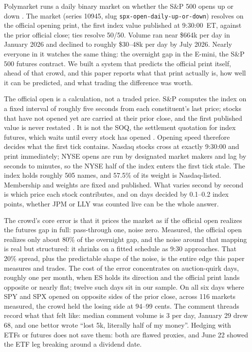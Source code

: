 \label{sec:introduction}

Polymarket runs a daily binary market on whether the S\&P 500 opens up or
down \citep{polymarket2026spxmarket}. The market (series 10945, slug
\texttt{spx-open-daily-up-or-down}) resolves on the official opening print,
the first index value published at 9:30:00~ET, against the prior
official close; ties resolve 50/50. Volume ran near \$664k per day in
January 2026 and declined to roughly \$30--48k per day by July 2026. Nearly
everyone in it watches the same thing: the overnight gap in the E-mini,
the S\&P 500 futures contract. We built a system that predicts the
official print itself, ahead of that crowd, and this paper reports what
that print actually is, how well it can be predicted, and what trading the
difference was worth.

The official open is a calculation, not a traded price. S\&P computes the
index on a fixed interval of roughly five seconds from each constituent's
last price; stocks that have not opened yet are carried at their prior
close, and the first published value is never restated
\citep{spdji2026indexmath}. It is not the SOQ, the settlement quotation
for index futures, which waits until every stock has opened
\citep{cme2026soq}. Opening speed therefore decides what the first tick
contains. Nasdaq stocks cross at exactly 9:30:00 and print immediately;
NYSE opens are run by designated market makers and lag by seconds to
minutes, so the NYSE half of the index enters the first tick stale. The
index holds roughly 505 names, and 57.5\% of its weight is Nasdaq-listed.
Membership and weights are fixed and published. What varies second by
second is which price each stock contributes, and on days decided by
0.1--0.2 index points, whether JPM or LLY was counted live can be the whole
answer.

The crowd's core error is that it prices the market as if the official open
realizes the futures gap in full: pass-through one, noise zero. Measured,
the official open realizes only about 80\% of the overnight gap, and the
noise around that mapping is real but structured: it shrinks on a fitted
schedule as 9:30 approaches. That 20\% spread, plus the predictable shape
of the noise, is the entire edge this paper measures and trades. The cost
of the error concentrates on auction-quirk days, roughly one per month,
when ES holds its direction and the official print lands opposite or nearly
flat; twelve such days sit in our sample. On all six days where SPY and SPX
opened on opposite sides of the prior close, across 116 markets measured,
the crowd held the losing side at 94--99 cents. The comment threads record
what that felt like: median comment volume is 3 per day, January 29 drew
68, and one bettor wrote ``lost 5k, literally half of my money''. Hedging
with ETFs or futures does not save them: both are flawed proxies, and
June 22 showed the ETF leg breaking around a dividend date.

